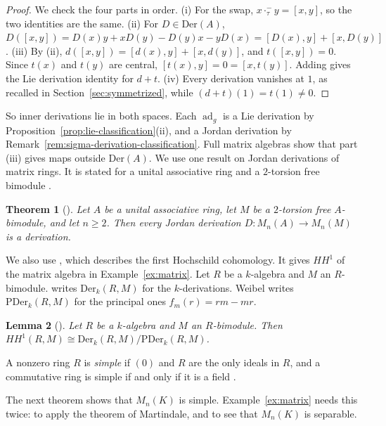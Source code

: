 \documentclass[]{interact}
\theoremstyle{plain}
\newtheorem{theorem}{Theorem}[section]
\newtheorem{lemma}[theorem]{Lemma}
\theoremstyle{definition}
\theoremstyle{remark}
\newcommand{\Der}{\mathrm{Der}}
\begin{document}
\begin{proof}
We check the four parts in order.
(i) For the swap, $x \cdot_\tau^- y = [x,y]$, so the two identities are the same.
(ii) For $D \in \Der(A)$, $D([x,y]) = D(x)y + xD(y) - D(y)x - yD(x) = [D(x), y] + [x, D(y)]$.
(iii) By (ii), $d([x,y]) = [d(x),y] + [x,d(y)]$, and $t([x,y]) = 0$.
Since $t(x)$ and $t(y)$ are central, $[t(x), y] = 0 = [x, t(y)]$.
Adding gives the Lie derivation identity for $d + t$.
(iv) Every derivation vanishes at $1$, as recalled in Section~\ref{sec:symmetrized}, while $(d+t)(1) = t(1) \neq 0$.
\end{proof}

So inner derivations lie in both spaces.
Each $\operatorname{ad}_g$ is a Lie derivation by Proposition~\ref{prop:lie-classification}(ii), and a Jordan derivation by Remark~\ref{rem:sigma-derivation-classification}.
Full matrix algebras show that part (iii) gives maps outside $\Der(A)$.
We use one result on Jordan derivations of matrix rings.
It is stated for a unital associative ring and a $2$-torsion free bimodule \citep[\S2]{Alizadeh2009}.

\begin{theorem}[{\citep[Theorem 3.1]{Alizadeh2009}}]\label{thm:alizadeh}
Let $A$ be a unital associative ring, let $M$ be a $2$-torsion free $A$-bimodule, and let $n \geq 2$. Then every Jordan derivation $D \colon M_n(A) \to M_n(M)$ is a derivation.
\end{theorem}

We also use \citet[Lemma 9.2.1]{Weibel1994}, which describes the first Hochschild cohomology.
It gives $HH^1$ of the matrix algebra in Example~\ref{ex:matrix}.
Let $R$ be a $k$-algebra and $M$ an $R$-bimodule.
\citet[\S9.2]{Weibel1994} writes $\mathrm{Der}_k(R,M)$ for the $k$-derivations.
Weibel writes $\mathrm{PDer}_k(R,M)$ for the principal ones $f_m(r) = rm - mr$.

\begin{lemma}[{\citep[Lemma 9.2.1]{Weibel1994}}]\label{lem:weibel}
Let $R$ be a $k$-algebra and $M$ an $R$-bimodule. Then $HH^1(R, M) \cong \mathrm{Der}_k(R,M)/\mathrm{PDer}_k(R,M)$.
\end{lemma}

A nonzero ring $R$ is \emph{simple} if $(0)$ and $R$ are the only ideals in $R$, and a commutative ring is simple if and only if it is a field \citep[\S1]{Lam2001}.

The next theorem shows that $M_n(K)$ is simple.
Example~\ref{ex:matrix} needs this twice: to apply the theorem of Martindale, and to see that $M_n(K)$ is separable.
\end{document}
